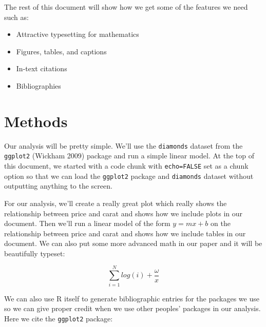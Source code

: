\documentclass[]{article}
\providecommand{\tightlist}{%
  \setlength{\itemsep}{0pt}\setlength{\parskip}{0pt}}
\begin{document}
The rest of this document will show how we get some of the features we
need such as:

\begin{itemize}
\tightlist
\item
  Attractive typesetting for mathematics
\item
  Figures, tables, and captions
\item
  In-text citations
\item
  Bibliographies
\end{itemize}

\section{Methods}\label{methods}

Our analysis will be pretty simple. We'll use the \texttt{diamonds}
dataset from the \texttt{ggplot2} (Wickham 2009) package and run a
simple linear model. At the top of this document, we started with a code
chunk with \texttt{echo=FALSE} set as a chunk option so that we can load
the \texttt{ggplot2} package and \texttt{diamonds} dataset without
outputting anything to the screen.

For our analysis, we'll create a really great plot which really shows
the relationship between price and carat and shows how we include plots
in our document. Then we'll run a linear model of the form
\(y = mx + b\) on the relationship between price and carat and shows how
we include tables in our document. We can also put some more advanced
math in our paper and it will be beautifully typeset:

\[\sum_{i=1}^{N}{log(i) + \frac{\omega}{x}}\]

We can also use R itself to generate bibliographic entries for the
packages we use so we can give proper credit when we use other peoples'
packages in our analysis. Here we cite the \texttt{ggplot2} package:
\end{document}
